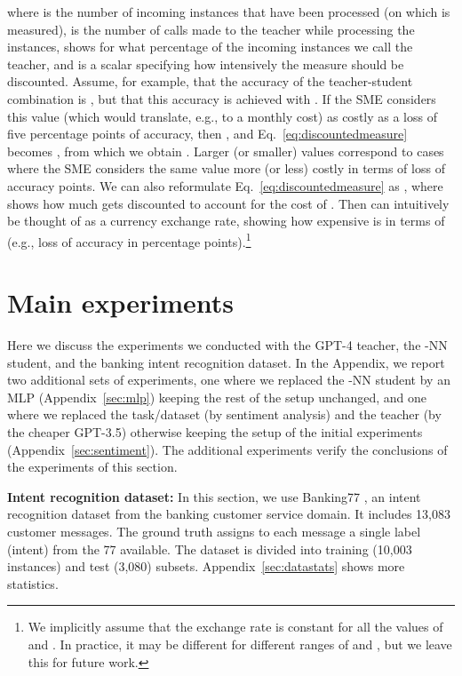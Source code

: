 \documentclass[11pt]{article}
\begin{document}
where  is the number of incoming instances that have been processed (on which  is measured),  is the number of calls made to the teacher while processing the  instances,  shows for what percentage of the incoming instances we call the teacher, and  is a scalar specifying how intensively the measure should be discounted. Assume, for example, that the accuracy of the teacher-student combination is , but that this accuracy is achieved with . If the SME considers this  value (which would translate, e.g., to a monthly cost) as costly as a loss of five percentage points of accuracy, then , and Eq.~\ref{eq:discountedmeasure} becomes , from which we obtain . Larger (or smaller)  values correspond to cases where the SME considers the same  value more (or less) costly in terms of loss of accuracy points. We can also reformulate Eq.~\ref{eq:discountedmeasure} as , where  shows how much  gets discounted to account for the cost of . Then  can intuitively be thought of as a currency exchange rate, showing how expensive  is in terms of  (e.g., loss of accuracy in percentage points).\footnote{We implicitly assume that the exchange rate  is constant for all the values of  and . In practice, it may be different for different ranges of  and , but we leave this for future work.} 

\section{Main experiments} \label{sec:main_experiments}
\label{sec:exp_setup}

Here we discuss the experiments we conducted with the GPT-4 teacher, the -NN student, and the banking intent recognition dataset. In the Appendix, we report two additional sets of experiments, one where we replaced the -NN student by an MLP (Appendix~\ref{sec:mlp}) keeping the rest of the setup unchanged, and one where we replaced the task/dataset (by sentiment analysis) and the teacher (by the cheaper GPT-3.5) otherwise keeping the setup of the initial experiments (Appendix~\ref{sec:sentiment}). The additional experiments verify the conclusions of the experiments of this section. 

\vspace{1mm}\noindent\textbf{Intent recognition dataset:} 
In this section, we use Banking77 \cite{banking77}, an intent recognition dataset from the banking customer service domain. It includes 13,083 customer messages. The ground truth assigns to each message a single label (intent) from the 77 available. The dataset is divided into training (10,003 instances) and test (3,080) subsets. Appendix~\ref{sec:datastats} shows more statistics. 
\end{document}
